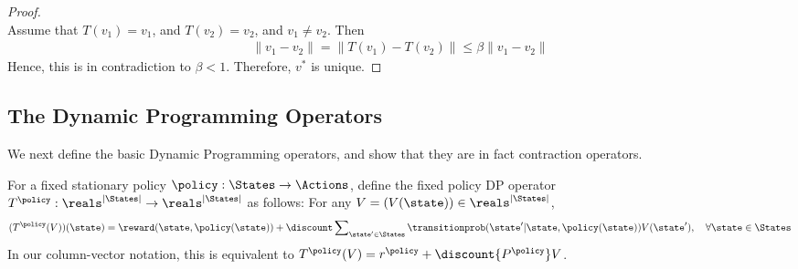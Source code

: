 \begin{proof}
\bigskip
{}\\
Assume that $T(v_1) = v_1$, and $T(v_2) = v_2$, and $v_1 \neq v_2$.
Then
\begin{eqnarray*}
  \|v_1-v_2\|=\|T(v_1)-T(v_2)\| \leq \beta\|v_1-v_2\|
\end{eqnarray*}
Hence, this is in contradiction to $\beta<1$. Therefore, $v^*$ is
unique.
%
\end{proof}


\subsection{The Dynamic Programming Operators}\label{ss:DP_op}
We next define the basic Dynamic Programming operators, and show that they are in fact contraction operators.

For a fixed stationary policy $\policy :\States \to \Actions$,
define the fixed policy DP operator $T^\policy:\reals^{|\States|}
\to \reals^{|\States|}$ as follows: For any $V=(V(\state))\in
\reals^{|\States|}$,
\[(T_{}^\policy (V))(\state) = \reward(\state,\policy(\state)) + \discount \sum\nolimits_{\state' \in \States} {\transitionprob(\state'|\state,\policy (\state))V(\state')} ,\quad\forall \state \in \States\]
In our column-vector notation, this is equivalent to  $T_{}^\policy
(V) = {r^\policy } + \discount {P^\policy }V$.

